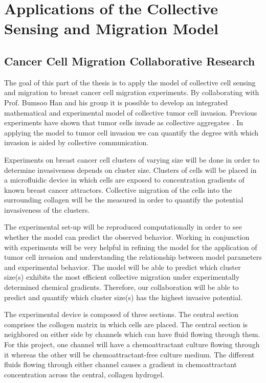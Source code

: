 \documentclass[a4paper]{article}
\begin{document}
\section{Applications of the Collective Sensing and Migration Model}

\subsection{Cancer Cell Migration Collaborative Research}

The goal of this part of the thesis is to apply the model of collective cell sensing and migration to breast cancer cell migration experiments. By collaborating with Prof. Bumsoo Han and his group it is possible to develop an integrated mathematical and experimental model of collective tumor cell invasion. Previous experiments have shown that tumor cells invade as collective aggregates \cite{cheung2013collective,friedl2012classifying}. In applying the model to tumor cell invasion we can quantify the degree with which invasion is aided by collective communication.

Experiments on breast cancer cell clusters of varying size will be done in order to determine invasiveness depends on cluster size. Clusters of cells will be placed in a microfluidic device \cite{kwak2014simulation,shin2013development} in which cells are exposed to concentration gradients of known breast cancer attractors. Collective migration of the cells into the surrounding collagen will be the measured in order to quantify the potential invasiveness of the clusters.

The experimental set-up will be reproduced computationally in order to see whether the model can predict the observed behavior. Working in conjunction with experiments will be very helpful in refining the model for the application of tumor cell invasion and understanding the relationship between model parameters and experimental behavior. The model will be able to predict which cluster size(s) exhibits the most efficient collective migration under experimentally determined chemical gradients. Therefore, our collaboration will be able to predict and quantify which cluster size(s) has the highest invasive potential.

The experimental device is composed of three sections. The central section comprises the collogen matrix in which cells are placed. The central section is neighbored on either side by channels which can have fluid flowing through them. For this project, one channel will have a chemoattractant culture flowing through it whereas the other will be chemoattractant-free culture medium. The different fluids flowing through either channel causes a gradient in chemoattractant concentration across the central, collagen hydrogel.
\end{document}
